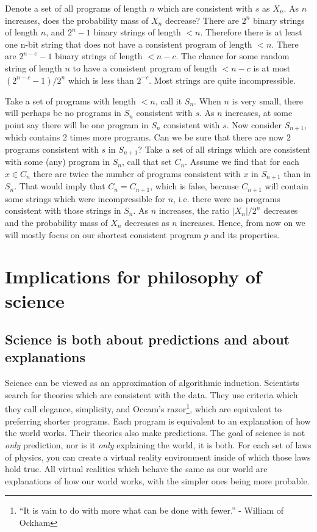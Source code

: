 \documentclass[oneside,hidelinks]{article}
\begin{document}
Denote a set of all programs of length $n$ which are consistent with $s$ as $X_n$.
As $n$ increases, does the probability mass of $X_n$ decrease?
There are $2^n$ binary strings of length $n$, and $2^n-1$ binary strings of length $<n$.
Therefore there is at least one n-bit string that does not have a consistent program of length $<n$.
There are $2^{n-c}-1$ binary strings of length $<n-c$.
The chance for some random string of length $n$ to have a consistent program of length $<n-c$ is at most $(2^{n-c}-1)/2^n$ which is less than $2^{-c}$.
Most strings are quite incompressible.

Take a set of programs with length $<n$, call it $S_n$.
When $n$ is very small, there will perhaps be no programs in $S_n$ consistent with $s$.
As $n$ increases, at some point say there will be one program in $S_n$ consistent with $s$.
Now consider $S_{n+1}$, which contains 2 times more programs.
Can we be sure that there are now 2 programs consistent with $s$ in $S_{n+1}$?
Take a set of all strings which are consistent with some (any) program in $S_n$, call that set $C_n$.
Assume we find that for each $x \in C_n$ there are twice the number of programs consistent with $x$ in $S_{n+1}$ than in $S_n$.
That would imply that $C_n = C_{n+1}$, which is false, because $C_{n+1}$ will contain some strings which were incompressible for $n$, i.e. there were no programs consistent with those strings in $S_n$.
As $n$ increases, the ratio $|X_n|/2^n$ decreases and the probability mass of $X_n$ decreases as $n$ increases.
Hence, from now on we will mostly focus on our shortest consistent program $p$ and its properties.

\newpage

\section{Implications for philosophy of science}

\subsection{Science is both about predictions and about explanations}

Science can be viewed as an approximation of algorithmic induction.
Scientists search for theories which are consistent with the data.
They use criteria which they call elegance, simplicity, and Occam's razor\footnote{“It is vain to do with more what can be done with fewer.” - William of Ockham}, which are equivalent to preferring shorter programs.
Each program is equivalent to an explanation of how the world works.
Their theories also make predictions.
The goal of science is not \textit{only} prediction, nor is it \textit{only} explaining the world, it is both.
For each set of laws of physics, you can create a virtual reality environment inside of which those laws hold true.
All virtual realities which behave the same as our world are explanations of how our world works, with the simpler ones being more probable.
\end{document}
